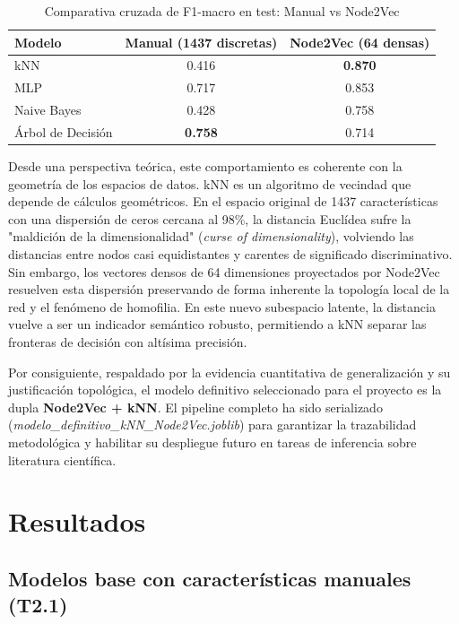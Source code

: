 \documentclass[conference,a4paper]{IEEEtran}
\begin{document}
\begin{table}[htbp]
\caption{Comparativa cruzada de F1-macro en test: Manual vs Node2Vec}
\centering
\begin{tabular}{lcc}
\toprule
Modelo & Manual (1437 discretas) & Node2Vec (64 densas) \\
\midrule
kNN & 0.416 & \textbf{0.870} \\
MLP & 0.717 & 0.853 \\
Naive Bayes & 0.428 & 0.758 \\
Árbol de Decisión & \textbf{0.758} & 0.714 \\
\bottomrule
\end{tabular}
\label{tab:comparativa_estrategias}
\end{table}

Desde una perspectiva teórica, este comportamiento es coherente con la geometría de los espacios de datos. kNN es un algoritmo de vecindad que depende de cálculos geométricos. 
En el espacio original de 1437 características con una dispersión de ceros cercana al 98\%, la distancia Euclídea sufre la "maldición de la dimensionalidad" 
(\textit{curse of dimensionality}), volviendo las distancias entre nodos casi equidistantes y carentes de significado discriminativo. Sin embargo, los vectores densos de 64 dimensiones 
proyectados por Node2Vec resuelven esta dispersión preservando de forma inherente la topología local de la red y el fenómeno de homofilia. En este nuevo subespacio latente, la distancia 
vuelve a ser un indicador semántico robusto, permitiendo a kNN separar las fronteras de decisión con altísima precisión.

Por consiguiente, respaldado por la evidencia cuantitativa de generalización y su justificación topológica, el modelo definitivo seleccionado para el proyecto es la dupla 
\textbf{Node2Vec + kNN}. El pipeline completo ha sido serializado (\textit{modelo\_definitivo\_kNN\_Node2Vec.joblib}) para garantizar la trazabilidad metodológica y habilitar su 
despliegue futuro en tareas de inferencia sobre literatura científica.

\section{\textbf{Resultados}}

\subsection{Modelos base con características manuales (T2.1)}
\end{document}
